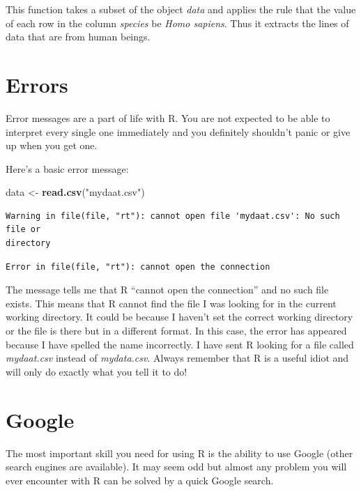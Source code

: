 \documentclass[
]{book}
\newenvironment{Shaded}{\begin{snugshade}}{\end{snugshade}}
\newcommand{\KeywordTok}[1]{\textcolor[rgb]{0.13,0.29,0.53}{\textbf{#1}}}
\newcommand{\NormalTok}[1]{#1}
\newcommand{\StringTok}[1]{\textcolor[rgb]{0.31,0.60,0.02}{#1}}
\begin{document}
This function takes a subset of the object \emph{data} and applies the rule that the value of each row in the column \emph{species} be \emph{Homo sapiens}. Thus it extracts the lines of data that are from human beings.

\hypertarget{errors}{%
\section{Errors}\label{errors}}

Error messages are a part of life with R. You are not expected to be able to interpret every single one immediately and you definitely shouldn't panic or give up when you get one.

Here's a basic error message:

\begin{Shaded}
\begin{Highlighting}[]
\NormalTok{data \textless{}{-}}\StringTok{ }\KeywordTok{read.csv}\NormalTok{(}\StringTok{"mydaat.csv"}\NormalTok{)}
\end{Highlighting}
\end{Shaded}

\begin{verbatim}
Warning in file(file, "rt"): cannot open file 'mydaat.csv': No such file or
directory
\end{verbatim}

\begin{verbatim}
Error in file(file, "rt"): cannot open the connection
\end{verbatim}

The message tells me that R ``cannot open the connection'' and no such file exists. This means that R cannot find the file I was looking for in the current working directory. It could be because I haven't set the correct working directory or the file is there but in a different format. In this case, the error has appeared because I have spelled the name incorrectly. I have sent R looking for a file called \emph{mydaat.csv} instead of \emph{mydata.csv}. Always remember that R is a useful idiot and will only do exactly what you tell it to do!

\hypertarget{google}{%
\section{Google}\label{google}}

The most important skill you need for using R is the ability to use Google (other search engines are available). It may seem odd but almost any problem you will ever encounter with R can be solved by a quick Google search.
\end{document}
